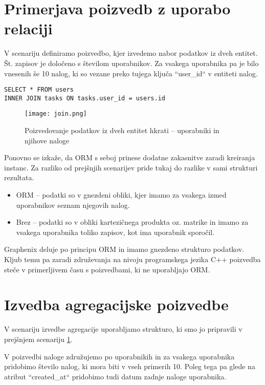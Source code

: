 \documentclass[a4paper,12pt,openright]{book}
\begin{document}
    \section{Primerjava poizvedb z uporabo relaciji}
    \label{join_lbl}

    V scenariju definiramo poizvedbo, kjer izvedemo nabor podatkov iz dveh entitet. Št. zapisov je določeno s številom uporabnikov. Za vsakega uporabnika pa je bilo vnesenih še 10 nalog, ki so vezane preko tujega ključa ``user\_id`` v entiteti nalog.
    
\begin{verbatim}
SELECT * FROM users 
INNER JOIN tasks ON tasks.user_id = users.id
\end{verbatim}

    \begin{figure}[H]
        \centerline{\texttt{[image: join.png]}}
        \caption{Poizvedovanje podatkov iz dveh entitet hkrati – uporabniki in njihove naloge}
        \label{join}
    \end{figure}

    \noindent
    Ponovno se izkaže, da ORM s seboj prinese dodatne zakasnitve zaradi kreiranja instanc. Za razliko od prejšnjih scenarijev pride tukaj do razlike v sami strukturi rezultata.
    
    \begin{itemize}
        \item ORM – podatki so v gnezdeni obliki, kjer imamo za vsakega izmed uporabnikov seznam njegovih nalog.
        \item Brez – podatki so v obliki kartezičnega produkta oz. matrike in imamo za vsakega uporabnika toliko zapisov, kot ima uporabnik sporočil.
    \end{itemize}

    \noindent
    Graphenix deluje po principu ORM in imamo gnezdeno strukturo podatkov. Kljub temu pa zaradi združevanja na nivoju programskega jezika C++ poizvedba steče v primerljivem času s poizvedbami, ki ne uporabljajo ORM.
    
    \section{Izvedba agregacijske poizvedbe}

    V scenariju izvedbe agregacije uporabljamo strukturo, ki smo jo pripravili v prejšnjem scenariju \ref{join_lbl}.

    V poizvedbi naloge združujemo po uporabnikih in za vsakega uporabnika pridobimo število nalog, ki mora biti v vseh primerih 10. Poleg tega pa glede na atribut ``created\_at`` pridobimo tudi datum zadnje naloge uporabnika.
    
\end{document}
